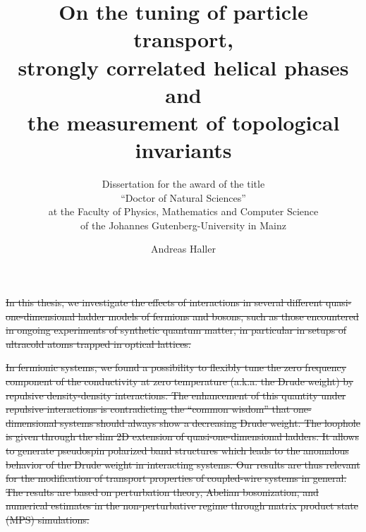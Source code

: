 \documentclass{svmono}
\providecommand{\DIFdeltex}[1]{{\protect\color{red}\sout{#1}}}                      %
\providecommand{\DIFdelbegin}{} %
\providecommand{\DIFdel}[1]{\texorpdfstring{\DIFdeltex{#1}}{}} %
\newcommand{\DIFscaledelfig}{0.5}
\newlength{\DIFdelgraphicswidth} %
\newlength{\DIFdelgraphicsheight} %
\newcommand{\DIFdelincludegraphics}[2][]{%
\sbox{\DIFdelgraphicsbox}{\DIFOincludegraphics[#1]{#2}}%
\settoboxwidth{\DIFdelgraphicswidth}{\DIFdelgraphicsbox} %
\settoboxtotalheight{\DIFdelgraphicsheight}{\DIFdelgraphicsbox} %
\scalebox{\DIFscaledelfig}{%
\parbox[b]{\DIFdelgraphicswidth}{\usebox{\DIFdelgraphicsbox}\\[-\baselineskip] \rule{\DIFdelgraphicswidth}{0em}}\llap{\resizebox{\DIFdelgraphicswidth}{\DIFdelgraphicsheight}{%
\setlength{\unitlength}{\DIFdelgraphicswidth}%
\begin{picture}(1,1)%
\thicklines\linethickness{2pt} %
{\color[rgb]{1,0,0}\put(0,0){\framebox(1,1){}}}%
{\color[rgb]{1,0,0}\put(0,0){\line( 1,1){1}}}%
{\color[rgb]{1,0,0}\put(0,1){\line(1,-1){1}}}%
\end{picture}%
}\hspace*{3pt}}} %
} %
\DeclareRobustCommand{\DIFdelbegin}{\DIFOdelbegin \let\includegraphics\DIFdelincludegraphics} %
\begin{document}
\author{Andreas Haller}
\title{On the tuning of particle transport,\\ strongly correlated helical phases and\\ the measurement of topological invariants}
\subtitle{Dissertation for the award of the title\\[0.5cm] {\Large``Doctor of Natural Sciences''}\\[0.5cm] at the Faculty of Physics, Mathematics and Computer Science\\ of the Johannes Gutenberg-University in Mainz}

\maketitle

\frontmatter \newpage
\setcounter{page}{1}

\clearpage{}\DIFdelbegin %
\addcontentsline{toc}{chapter}{\DIFdel{Abstract}}
\DIFdel{In this thesis, we investigate the effects of interactions in several different quasi-one-dimensional ladder models of fermions and bosons, such as those encountered in ongoing experiments of synthetic quantum matter, in particular in setups of ultracold atoms trapped in optical lattices.
}%

\DIFdel{In fermionic systems, we found a possibility to flexibly tune the zero frequency component of the conductivity at zero temperature (a.k.a. the Drude weight) by repulsive density-density interactions.
The enhancement of this quantity under repulsive interactions is contradicting the ``common wisdom'' that one-dimensional systems should always show a decreasing Drude weight.
The loophole is given through the slim 2D extension of quasi-one-dimensional ladders.
It allows to generate pseudospin polarized band structures which leads to the anomalous behavior of the Drude weight in interacting systems.
Our results are thus relevant for the modification of transport properties of coupled-wire systems in general.
The results are based on perturbation theory, Abelian bosonization, and numerical estimates in the non-perturbative regime through matrix product state (MPS) simulations.
}%
\end{document}
